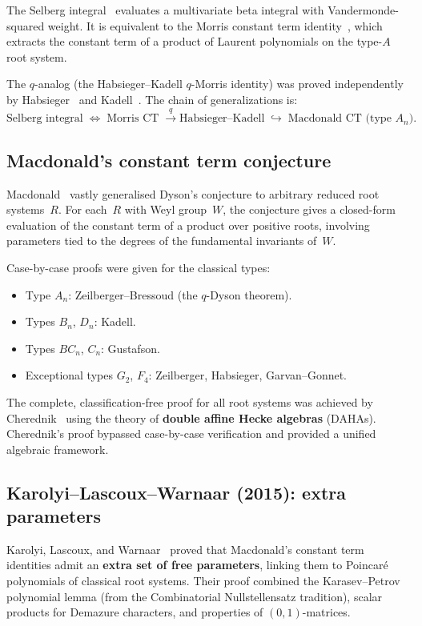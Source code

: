 \documentclass[11pt]{article}
\begin{document}
The Selberg integral~\cite{selberg-1944} evaluates a
multivariate beta integral with Vandermonde-squared weight.
It is equivalent to the Morris constant term
identity~\cite{morris-1982}, which extracts the constant term
of a product of Laurent polynomials on the type-$A$ root system.

The $q$-analog (the Habsieger--Kadell $q$-Morris identity) was
proved independently by Habsieger~\cite{habsieger-1988} and
Kadell~\cite{kadell-1988}. The chain of generalizations is:
\[
  \text{Selberg integral}
  \;\iff\; \text{Morris CT}
  \;\xrightarrow{q}
  \text{Habsieger--Kadell}
  \;\hookrightarrow\; \text{Macdonald CT (type $A_n$)}.
\]

\subsection{Macdonald's constant term conjecture}

Macdonald~\cite{macdonald-1982} vastly generalised Dyson's
conjecture to arbitrary reduced root systems~$R$. For each~$R$
with Weyl group~$W$, the conjecture gives a closed-form
evaluation of the constant term of a product over positive
roots, involving parameters tied to the degrees of the
fundamental invariants of~$W$.

Case-by-case proofs were given for the classical types:
\begin{itemize}
  \item Type $A_n$: Zeilberger--Bressoud (the $q$-Dyson theorem).
  \item Types $B_n$, $D_n$: Kadell.
  \item Types $BC_n$, $C_n$: Gustafson.
  \item Exceptional types $G_2$, $F_4$: Zeilberger, Habsieger,
    Garvan--Gonnet.
\end{itemize}

The complete, classification-free proof for all root systems was
achieved by Cherednik~\cite{cherednik-1995} using the theory of
\textbf{double affine Hecke algebras} (DAHAs). Cherednik's proof
bypassed case-by-case verification and provided a unified
algebraic framework.

\subsection{Karolyi--Lascoux--Warnaar (2015): extra parameters}

Karolyi, Lascoux, and Warnaar~\cite{klw-2015} proved that
Macdonald's constant term identities admit an
\textbf{extra set of free parameters}, linking them to
Poincar\'e polynomials of classical root systems. Their proof
combined the Karasev--Petrov polynomial lemma (from the
Combinatorial Nullstellensatz tradition), scalar products for
Demazure characters, and properties of $(0,1)$-matrices.
\end{document}

